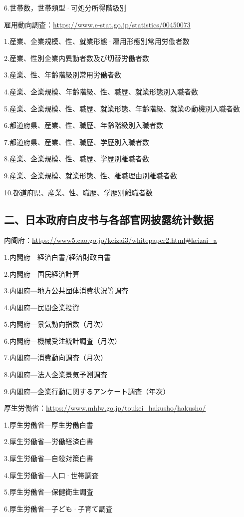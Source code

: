6.世帯数，世帯類型·可処分所得階級別

雇用動向調査：\url{https://www.e-stat.go.jp/statistics/00450073}

1.産業、企業規模、性、就業形態·雇用形態別常用労働者数

2.産業、性別企業内異動者数及び切替労働者数

3.産業、性、年齢階級別常用労働者数

4.産業、企業規模、年齢階級、性、職歴、就業形態別入職者数

5.産業、企業規模、性、職歴、就業形態、年齢階級、就業の動機別入職者数

6.都道府県、産業、性、職歴、年齢階級別入職者数

7.都道府県、産業、性、職歴、学歴別入職者数

8.産業、企業規模、性、職歴、学歴別離職者数

9.産業、企業規模、就業形態、性、離職理由別離職者数

10.都道府県、産業、性、職歴、学歴別離職者数

\subsection{二、日本政府白皮书与各部官网披露统计数据}

内阁府：\url{https://www5.cao.go.jp/keizai3/whitepaper2.html#keizai_a}

1.内閣府—経済白書/経済財政白書

2.内閣府—国民経済計算

3.内閣府—地方公共団体消費状況等調査

4.内閣府—民間企業投資

5.内閣府—景気動向指数（月次）

6.内閣府—機械受注統計調査（月次）

7.内閣府—消費動向調査（月次）

8.内閣府—法人企業景気予測調査

9.内閣府—企業行動に関するアンケート調査（年次）

厚生労働省：\url{https://www.mhlw.go.jp/toukei_hakusho/hakusho/}

1.厚生労働省—厚生労働白書

2.厚生労働省—労働経済白書

3.厚生労働省—自殺対策白書

4.厚生労働省—人口·世帯調査

5.厚生労働省—保健衛生調査

6.厚生労働省—子ども·子育て調査

